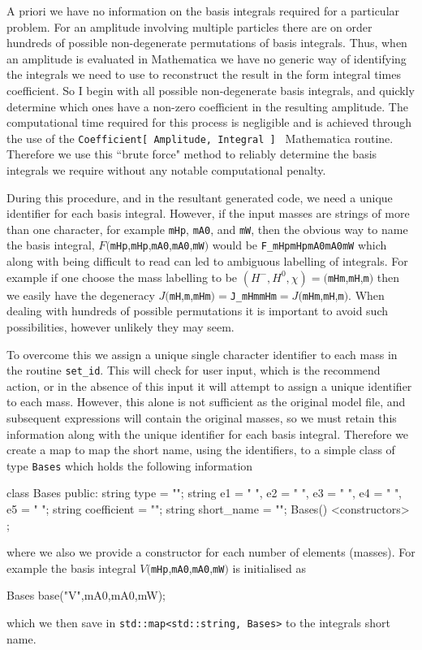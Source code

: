 A priori we have no information on the basis integrals required for a particular problem.  For an amplitude involving multiple particles there are on order hundreds of possible non-degenerate permutations of basis integrals.  Thus, when an amplitude is evaluated in Mathematica we have no generic way of identifying the integrals we need to use to reconstruct the result in the form integral times coefficient.  So I begin with all possible non-degenerate basis integrals, and quickly determine which ones have a non-zero coefficient in the resulting amplitude.  The computational time required for this process is negligible and is achieved through the use of the \lstinline{Coefficient[ Amplitude, Integral ] } Mathematica routine.  Therefore we use this ``brute force" method to reliably determine the basis integrals we require without any notable computational penalty.

During this procedure, and in the resultant generated \CC code, we need a unique identifier for each basis integral.  However, if the input masses are strings of more than one character, for example \lstinline{mHp}, \lstinline{mA0}, and \lstinline{mW}, then the obvious way to name the basis integral, $F($\lstinline{mHp},\lstinline{mHp},\lstinline{mA0},\lstinline{mA0},\lstinline{mW}$)$ would be \lstinline{F_mHpmHpmA0mA0mW} which along with being difficult to read can led to ambiguous labelling of integrals.  For example if one choose the mass labelling to be $(H^-, H^0, \chi ) = ($\lstinline{mHm},\lstinline{mH},\lstinline{m}$)$ then we easily have the degeneracy $J($\lstinline{mH},\lstinline{m},\lstinline{mHm}$) =  $\lstinline{J_mHmmHm}$ = J($\lstinline{mHm},\lstinline{mH},\lstinline{m}$)$.  When dealing with hundreds of possible permutations it is important to avoid such possibilities, however unlikely they may seem.

To overcome this we assign a unique single character identifier to each mass in the routine \lstinline{set_id}.  This will check for user input, which is the recommend action, or in the absence of this input it will attempt to assign a unique identifier to each mass.  However, this alone is not sufficient as the original \feynarts model file, and subsequent expressions will contain the original masses, so we must retain this information along with the unique identifier for each basis integral.  Therefore we create a \CC map to map the short name, using the identifiers, to a simple class of type \lstinline{Bases} which holds the following information
\begin{lstcpp}
class Bases
{
public:
	string type = "";
	string e1 = " ", e2 = " ", e3 = " ", e4 = " ", e5 = " ";
	string coefficient = "";
	string short_name = "";
	Bases() {}
	<constructors>
};
\end{lstcpp}
where we also we provide a constructor for each number of elements (masses).  For example the basis integral $V($\lstinline{mHp},\lstinline{mA0},\lstinline{mA0},\lstinline{mW}$)$ is initialised as\begin{lstcpp}
Bases base("V",mA0,mA0,mW);
\end{lstcpp}
which we then save in \lstinline{std::map<std::string, Bases>} to the integrals short name.

